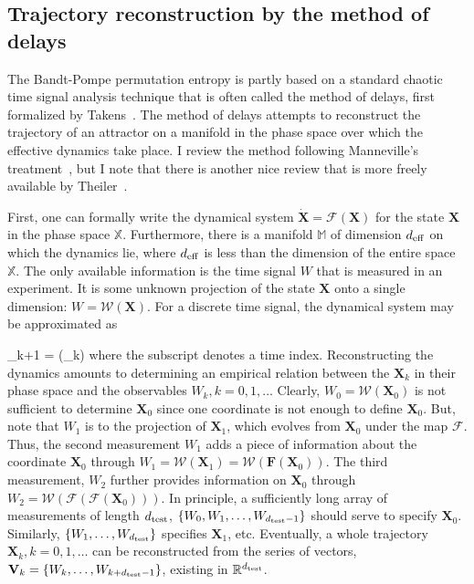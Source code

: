 \subsection{Trajectory reconstruction by the method of delays}
\label{ss_delays}

The Bandt-Pompe permutation entropy is partly based on a standard chaotic time signal analysis technique that is often called the method of delays, 
first formalized by Takens~\cite{takens1981}. The method of delays attempts to reconstruct the trajectory of an attractor on a manifold in the phase space over which the effective dynamics
take place. I review the method following Manneville's treatment~\cite{manneville2004}, but I note that there is another nice review that is more freely available by Theiler~\cite{theiler1990}.

First, one can formally write the dynamical system $\mathbf{\dot{X}} = \mathbf{\mathcal{F}} (\mathbf{X})$ for the state $\mathbf{X}$ in the phase space $\mathbb{X}$. Furthermore,
there is a manifold $\mathbb{M}$ of dimension $d_{\rm{eff}}$ on which the dynamics lie, where  $d_{\rm{eff}}$ is less than the dimension of the entire space $\mathbb{X}$. The only available
information is the time signal $W$ that is measured in an experiment. 
It is some unknown projection of the state $\mathbf{X}$ onto a single dimension: $W = \mathcal{W} ({\mathbf{X}})$. 
For a discrete time signal, the dynamical system may be approximated as

\beq
\label{dyn_sys_approx}
{}_{k+1} = {} ({}_k)
\eeq
where the subscript denotes a time index. Reconstructing the dynamics amounts to determining an empirical relation between the ${\mathbf{X}}_k$ in their phase space and the observables
$W_k, k=0,1, \ldots$ Clearly, $W_0 = {\mathcal{W}}({\mathbf{X}}_0)$ is not sufficient to determine ${\mathbf{X}}_0$ since one coordinate is not enough to define ${\mathbf{X}}_0$. But, note that
$W_1$ is to the projection of ${\mathbf{X}}_1$, which evolves from ${\mathbf{X}}_0$ under the map $\mathbf{\mathcal{F}}$. Thus, the second measurement $W_1$ adds a piece of information
about the coordinate ${\mathbf{X}}_0$ through $W_1 = {\mathcal{W}}({\mathbf{X}}_1) = {\mathcal{W}}({\mathcal{\mathbf{F}}} ({\mathbf{X}}_0))$. The third measurement, $W_2$ further provides information
on ${\mathbf{X}}_0$ through $W_2 = {\mathcal{W}}({\mathcal{F}} ({\mathcal{F}} ({\mathbf{X}}_0)))$. 
In principle, a sufficiently long array of measurements of length $d_{\rm{test}}$, $\{W_0, W_1, \ldots , W_{d_{\rm{test}}-1}\}$ should serve to specify
${\mathbf{X}}_0$. Similarly, $\{W_1, \ldots , W_{d_{\rm{test}}}\}$ specifies ${\mathbf{X}}_1$, etc. 
Eventually, a whole trajectory ${\mathbf{X}}_k, k=0,1,\ldots$ can be reconstructed from the series of vectors,
${\mathbf{V}}_k = \{W_k, \ldots , W_{k+d_{\rm{test}}-1}\}$, existing in ${\mathbb{R}}^{d_{\rm{test}}}$.

